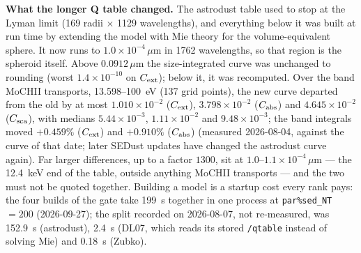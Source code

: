 \documentclass[english,a4paper]{my_memo}
\newcommand{\code}[1]{\texttt{#1}}
\begin{document}
\medskip\noindent
\textbf{What the longer Q table changed.}  The astrodust table used to stop at
the Lyman limit (169 radii $\times$ 1129 wavelengths), and everything below it
was built at run time by extending the model with Mie theory for the
volume-equivalent sphere.  It now runs to $1.0{\times}10^{-4}\,\mu$m in 1762
wavelengths, so that region is the spheroid itself.  Above $0.0912\,\mu$m the
size-integrated curve was unchanged to rounding (worst $1.4{\times}10^{-10}$ on
$C_{\rm ext}$); below it, it was recomputed.  Over the band MoCHII transports,
13.598--100~eV (137 grid points), the new curve departed from the old by at most
$1.010{\times}10^{-2}$ ($C_{\rm ext}$), $3.798{\times}10^{-2}$ ($C_{\rm abs}$)
and $4.645{\times}10^{-2}$ ($C_{\rm sca}$), with medians
$5.44{\times}10^{-3}$, $1.11{\times}10^{-2}$ and $9.48{\times}10^{-3}$; the
band integrals moved $+0.459\%$ ($C_{\rm ext}$) and $+0.910\%$
($C_{\rm abs}$) (measured 2026-08-04, against the curve of that date;
later SEDust updates have changed the astrodust curve again).  Far larger differences, up to a factor
$1300$, sit at $1.0$--$1.1{\times}10^{-4}\,\mu$m --- the 12.4~keV end of the
table, outside anything MoCHII transports --- and the two must not be quoted
together.  Building a model is a startup cost every rank pays: the four
builds of the gate take 199~s together in one process at
\code{par\%sed\_NT} $= 200$ (2026-09-27); the split recorded on 2026-08-07,
not re-measured, was 152.9~s (astrodust), 2.4~s (DL07, which reads its
stored \code{/qtable} instead of solving Mie) and 0.18~s (Zubko).
\end{document}
